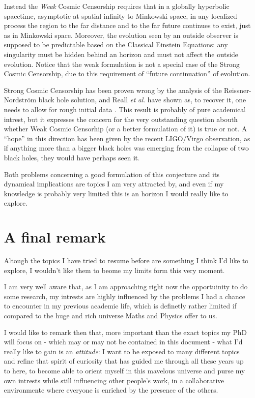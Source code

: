 \documentclass[12pt, a4paper]{article}
\begin{document}
Instead the \emph{Weak} Cosmic Censorship requires that in a globally hyperbolic spacetime, asymptotic at spatial infinity to Minkowski space, in any localized process the region to the far distance and to the far future continues to exist, just as in Minkowski space. Moreover, the evolution seen by an outside observer is supposed to be predictable based on the Classical Einstein Equations: any singularity must be hidden behind an horizon and must not affect the outside evolution.
Notice that the weak formulation is not a special case of the Strong Cosmic Censorship, due to this requirement of ``future continuation'' of evolution.

Strong Cosmic Censorship has been proven wrong by the analysis of the Reissner-Nordstr\"om black hole solution, and Reall \emph{et al.} have shown as, to recover it, one needs to allow for rough initial data \cite{dias2018strong}.
This result is probably of pure academical intrest, but it expresses the concern for the very outstanding question abouth whether Weak Cosmic Censorhip (or a better formulation of it) is true or not. 
A ``hope'' in this direction has been given by the recent LIGO/Virgo observation, as if anything more than a bigger black holes was emerging from the collapse of two black holes, they would have perhaps seen it.

Both problems concerning a good formulation of this conjecture and its dynamical implications are topics I am very attracted by, and even if my knowledge is probably very limited this is an horizon I would really like to explore.

\section{A final remark}
Altough the topics I have tried to resume before are something I think I'd like to  explore, I wouldn't like them to beome my limits form this very moment. 

I am very well aware that, as I am approaching right now the opportuinity to do some research, my intrests are highly influenced by the problems I had a chance to encounter in my previous academic life, which is definetly rather limited if compared to the huge and rich universe Maths and Physics offer to us.

I would like to remark then that, more important than the exact topics my PhD will focus on - which may or may not be contained in this document - what I'd really like to gain is an \emph{attitude}: I want to be exposed to many different topics and refine that spirit of curiosity that has guided me through all these years up to here, to become able to orient myself in this mavelous universe and purse my own intrests while still influencing other people's work, in a collaborative environmente where everyone is enriched by the presence of the others.

\clearpage


\printbibliography
\end{document}
